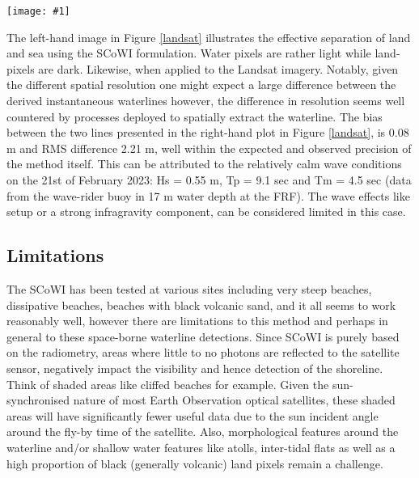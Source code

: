 \documentclass[remotesensing,technicalnote,submit,pdftex,moreauthors]{Definitions/mdpi}
\newcommand{\myfigure}[4]{
    \begin{figure*}[ht!]
        \centering
        \texttt{[image: \#1]}	 
        \caption{\itshape#2}
        \label{#3}
    \end{figure*} 
}
\begin{document}
\myfigure{img/duck_comparison_20230221_2.png}{SCoWI applied to Sentinel-2 and LandSat satellite optical imagery at Duck (USA). The left-hand image shows the SCoWI applied to a Sentinel-2 image (21 February 2023 at 15h50 GMT) and the middle image to Landsat-8 image (21 February 2023 at 15h41 GMT). The grey-scale limits are set between 2\% to 98\% of all pixel values for both images. The coloured lines represent the detected instantaneous waterline, which are then both superimposed onto a Sentinel-2 colour image on the right-hand side.}{landsat}{1}

The left-hand image in Figure \ref{landsat} illustrates the effective separation of land and sea using the SCoWI formulation. Water pixels are rather light while land-pixels are dark. Likewise, when applied to the Landsat imagery. Notably, given the different spatial resolution one might expect a large difference between the derived instantaneous waterlines however, the difference in resolution seems well countered by processes deployed to spatially extract the waterline.  The bias between the two lines presented in the right-hand plot in Figure \ref{landsat}, is 0.08 m and RMS difference 2.21 m, well within the expected and observed precision of the method itself. This can be attributed to the relatively calm wave conditions on the 21st of February 2023: Hs = 0.55 m, Tp = 9.1 sec and Tm = 4.5 sec (data from the wave-rider buoy in 17 m water depth at the FRF). The wave effects like setup or a strong infragravity component, can be considered limited in this case.

\subsection{Limitations}
The SCoWI has been tested at various sites including very steep beaches, dissipative beaches, beaches with black volcanic sand, and it all seems to work reasonably well, however there are limitations to this method and perhaps in general to these space-borne waterline detections. Since SCoWI is purely based on the radiometry, areas where little to no photons are reflected to the satellite sensor, negatively impact the visibility and hence detection of the shoreline. Think of shaded areas like cliffed beaches for example. Given the sun-synchronised nature of most Earth Observation optical satellites, these shaded areas will have significantly fewer useful data due to the sun incident angle around the fly-by time of the satellite. Also, morphological features around the waterline and/or shallow water features like atolls, inter-tidal flats as well as a high proportion of black (generally volcanic) land pixels remain a challenge.
\end{document}
